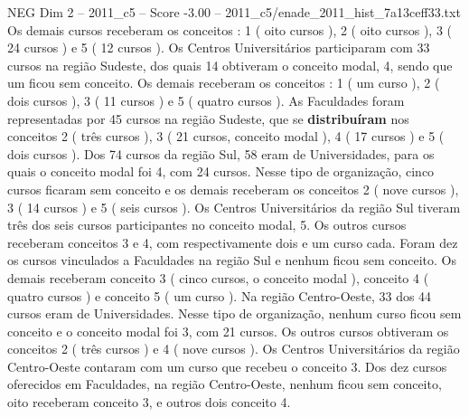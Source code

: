 \begin{textsample}{NEG Dim 2 – 2011\_c5 – Score -3.00 – 2011\_c5/enade\_2011\_hist\_7a13ceff33.txt}
Os demais cursos receberam os conceitos : 1 ( oito cursos ), 2 ( oito cursos ), 3 ( 24 cursos ) e 5 ( 12 cursos ).
Os Centros Universitários participaram com 33 cursos na região Sudeste, dos quais 14 obtiveram o conceito modal, 4, sendo que um ficou sem conceito.
Os demais receberam os conceitos : 1 ( um curso ), 2 ( dois cursos ), 3 ( 11 cursos ) e 5 ( quatro cursos ).
As Faculdades foram representadas por 45 cursos na região Sudeste, que se \textbf{distribuíram} nos conceitos 2 ( três cursos ), 3 ( 21 cursos, conceito modal ), 4 ( 17 cursos ) e 5 ( dois cursos ).
Dos 74 cursos da região Sul, 58 eram de Universidades, para os quais o conceito modal foi 4, com 24 cursos.
Nesse tipo de organização, cinco cursos ficaram sem conceito e os demais receberam os conceitos 2 ( nove cursos ), 3 ( 14 cursos ) e 5 ( seis cursos ).
Os Centros Universitários da região Sul tiveram três dos seis cursos participantes no conceito modal, 5.
Os outros cursos receberam conceitos 3 e 4, com respectivamente dois e um curso cada.
Foram dez os cursos vinculados a Faculdades na região Sul e nenhum ficou sem conceito.
Os demais receberam conceito 3 ( cinco cursos, o conceito modal ), conceito 4 ( quatro cursos ) e conceito 5 ( um curso ).
Na região Centro-Oeste, 33 dos 44 cursos eram de Universidades.
Nesse tipo de organização, nenhum curso ficou sem conceito e o conceito modal foi 3, com 21 cursos.
Os outros cursos obtiveram os conceitos 2 ( três cursos ) e 4 ( nove cursos ).
Os Centros Universitários da região Centro-Oeste contaram com um curso que recebeu o conceito 3.
Dos dez cursos oferecidos em Faculdades, na região Centro-Oeste, nenhum ficou sem conceito, oito receberam conceito 3, e outros dois conceito 4.

\end{textsample}
